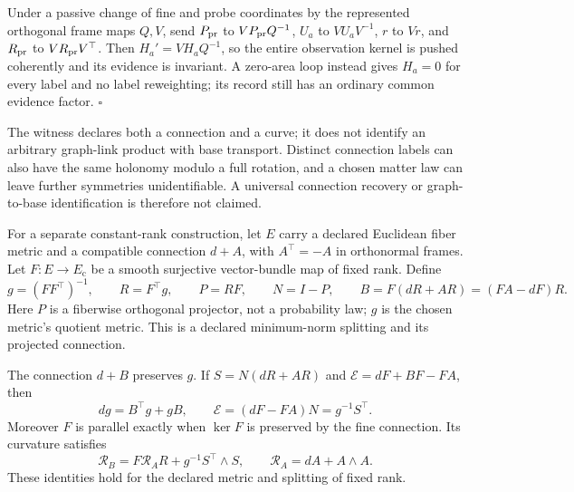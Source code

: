 Under a passive change of fine and probe coordinates by the represented
orthogonal frame maps \(Q,V\), send
\(P_{\rm pr}\) to \(VP_{\rm pr}Q^{-1}\), \(U_a\) to
\(VU_aV^{-1}\), \(r\) to \(Vr\), and \(R_{\rm pr}\) to
\(VR_{\rm pr}V^\top\). Then \(H_a'=VH_aQ^{-1}\), so the entire
observation kernel is pushed coherently and its evidence is invariant.
A zero-area loop instead gives \(H_a=0\) for every label and no label
reweighting; its record still has an ordinary common evidence factor.
\(\square\)

The witness declares both a connection and a curve; it does not identify an
arbitrary graph-link product with base transport. Distinct connection labels
can also have the same holonomy modulo a full rotation, and a chosen matter
law can leave further symmetries unidentifiable. A universal connection
recovery or graph-to-base identification is therefore not claimed.

For a separate constant-rank construction, let \(E\) carry a declared
Euclidean fiber metric and a compatible connection \(d+A\), with
\(A^\top=-A\) in orthonormal frames. Let \(F:E\to E_{\mathrm c}\)
be a smooth surjective vector-bundle map of fixed rank. Define
\begin{equation}
 g=(FF^\top)^{-1},\qquad R=F^\top g,\qquad
 P=RF,\qquad N=I-P,
 \qquad B=F(dR+AR)=(FA-dF)R.
\label{eq:rg-cover-quotient-data}
\end{equation}
Here \(P\) is a fiberwise orthogonal projector, not a probability law;
\(g\) is the chosen metric's quotient metric. This is a declared
minimum-norm splitting and its projected connection.

The connection \(d+B\) preserves \(g\). If
\(S=N(dR+AR)\) and \(\mathcal E=dF+BF-FA\), then
\begin{equation}
 dg=B^\top g+gB,\qquad
 \mathcal E=(dF-FA)N=g^{-1}S^\top.
\label{eq:rg-cover-projected-defect}
\end{equation}
Moreover \(F\) is parallel exactly when \(\ker F\) is preserved by the
fine connection. Its curvature satisfies
\begin{equation}
 \mathcal R_B=F\mathcal R_A R+g^{-1}S^\top\wedge S,
 \qquad \mathcal R_A=dA+A\wedge A.
\label{eq:rg-cover-projected-curvature}
\end{equation}
These identities hold for the declared metric and splitting of fixed rank. 

